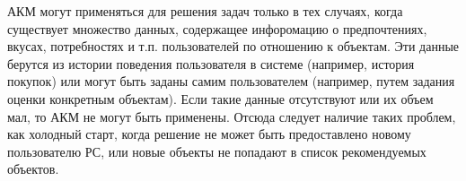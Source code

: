 
АКМ могут применяться для решения задач только в тех случаях,
когда существует множество данных, содержащее инфоромацию о предпочтениях,
вкусах, потребностях и т.п. пользователей по отношению к объектам.
Эти данные берутся
из истории поведения пользователя в системе (например, история покупок) или
могут быть заданы самим пользователем (например, путем задания оценки
конкретным объектам). Если такие данные отсутствуют или их объем мал,
то АКМ не могут быть применены. Отсюда следует наличие таких проблем, как
холодный старт, когда решение не может быть предоставлено новому
пользователю РС, или новые объекты не попадают в список рекомендуемых объектов.




